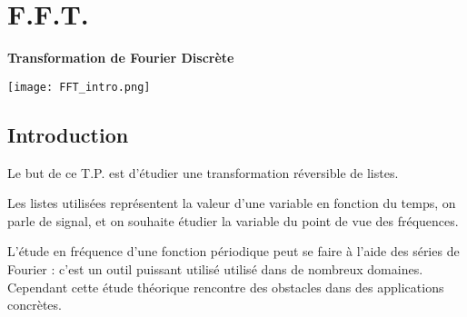 \chapter{F.F.T.}
\thispagestyle{empty}
\begin{center}
 \bf \huge Transformation de Fourier Discrète
\end{center}
\begin{center}
 \texttt{[image: FFT\_intro.png]}
\end{center}
\section{Introduction}
Le but de ce T.P. est d'étudier une transformation réversible de listes.

Les listes utilisées représentent la valeur d'une variable en fonction du temps, on parle de signal, et on souhaite étudier la variable du point de vue des fréquences.

L'étude en fréquence d'une fonction périodique peut se faire à l'aide des séries de Fourier : c'est un outil puissant utilisé utilisé dans de nombreux domaines. Cependant cette étude théorique rencontre des obstacles dans des applications concrètes.

